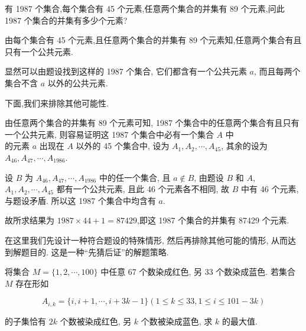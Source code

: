 \begin{example}
有 1987 个集合,每个集合有 45 个元素,任意两个集合的并集有 89 个元素,问此 1987 个集合的并集有多少个元素?
\end{example}

\begin{analysis}
由每个集合有 45 个元素,且任意两个集合的并集有 89 个元素知,任意两个集合有且只有一个公共元素.
\end{analysis}

\begin{solution}
显然可以由题设找到这样的 1987 个集合, 它们都含有一个公共元素 $a$, 而且每两个集合不含 $a$ 以外的公共元素.

下面,我们来排除其他可能性.

由任意两个集合的并集有 89 个元素可知, 1987 个集合中的任意两个集合有且只有一个公共元素, 则容易证明这 1987 个集合中必有一个集合 $A$ 中\\
的元素 $a$ 出现在 $A$ 以外的 45 个集合中, 设为 $A_{1}, A_{2}, \cdots, A_{45}$, 其余的设为 $A_{46}, A_{47}, \cdots, A_{1986}$.

设 $B$ 为 $A_{46}, A_{47}, \cdots, A_{1986}$ 中的任一个集合, 且 $a \notin B$, 由题设 $B$ 和 $A$, $A_{1}, A_{2}, \cdots, A_{45}$ 都有一个公共元素, 且此 46 个元素各不相同, 故 $B$ 中有 46 个元素,与题设矛盾. 所以这 1987 个集合中均含有 $a$.

故所求结果为 $1987 \times 44+1=87429$,即这 1987 个集合的并集有 87429 个元素.
\end{solution}

\begin{note}
在这里我们先设计一种符合题设的特殊情形, 然后再排除其他可能的情形, 从而达到解题目的. 这是一种“先猜后证”的解题策略.
\end{note}

\begin{example}
将集合 $M=\{1,2, \cdots, 100\}$ 中任意 67 个数染成红色, 另 33 个数染成蓝色. 若集合 $M$ 存在形如

$$
A_{i, k}=\{i, i+1, \cdots, i+3 k-1\}(1 \leqslant k \leqslant 33,1 \leqslant i \leqslant 101-3 k)
$$

的子集恰有 $2 k$ 个数被染成红色, 另 $k$ 个数被染成蓝色, 求 $k$ 的最大值.
\end{example}

